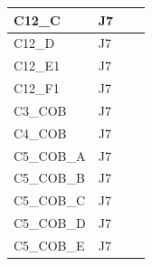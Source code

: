 \begin{longtable}{|l|l|l|l|}
C12\_C                           & J7                                                &                                                  &                                                  \\ \hline
C12\_D                           & J7                                                &                                                  &                                                  \\ \hline
C12\_E1                           & J7                                                &                                                  &                                                  \\ \hline
C12\_F1                           & J7                                                &                                                  &                                                  \\ \hline
C3\_COB                           & J7                                                &                                                  &                                                  \\ \hline
C4\_COB                           & J7                                                &                                                  &                                                  \\ \hline
C5\_COB\_A                           & J7                                                &                                                  &                                                  \\ \hline
C5\_COB\_B                           & J7                                                &                                                  &                                                  \\ \hline
C5\_COB\_C                           & J7                                                &                                                  &                                                  \\ \hline
C5\_COB\_D                           & J7                                                &                                                  &                                                  \\ \hline
C5\_COB\_E                           & J7                                                &                                                  &                                                  \\ \hline

\end{longtable}

